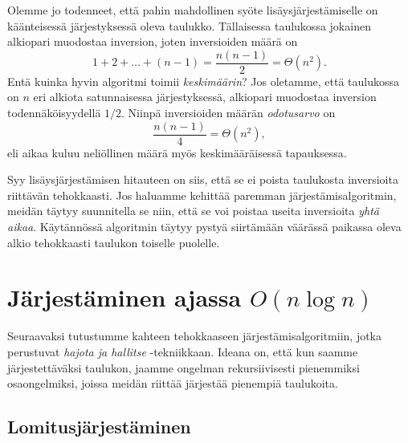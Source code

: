 Olemme jo todenneet, että pahin mahdollinen syöte
lisäysjärjestämiselle on käänteisessä järjestyksessä oleva taulukko.
Tällaisessa taulukossa jokainen alkiopari muodostaa inversion,
joten inversioiden määrä on
\[1+2+\dots+(n-1)=\frac{n(n-1)}{2}=\Theta(n^2).\]
Entä kuinka hyvin algoritmi toimii \emph{keskimäärin}?
Jos oletamme, että taulukossa on $n$ eri alkiota satunnaisessa
järjestyksessä, alkiopari muodostaa inversion todennäköisyydellä $1/2$.
Niinpä inversioiden määrän \emph{odotusarvo} on
\[\frac{n(n-1)}{4}=\Theta(n^2),\]
eli aikaa kuluu neliöllinen määrä myös keskimääräisessä
tapauksessa.

Syy lisäysjärjestämisen hitauteen on siis,
että se ei poista taulukosta inversioita riittävän tehokkaasti.
Jos haluamme kehittää paremman järjestämis\-algoritmin,
meidän täytyy suunnitella se niin, että se voi poistaa
useita inversioita \emph{yhtä aikaa}.
Käytännössä algoritmin täytyy pystyä siirtämään
väärässä paikassa oleva alkio tehokkaasti taulukon
toiselle puolelle.

\section{Järjestäminen ajassa $O(n \log n)$}

Seuraavaksi tutustumme kahteen tehokkaaseen
järjestämisalgoritmiin, jotka perustuvat
\emph{hajota ja hallitse} -tekniikkaan.
Ideana on, että kun saamme järjestettäväksi taulukon,
jaamme ongelman rekursiivisesti pienemmiksi osa\-ongelmiksi,
joissa meidän riittää järjestää pienempiä taulukoita.

\subsection{Lomitusjärjestäminen}

